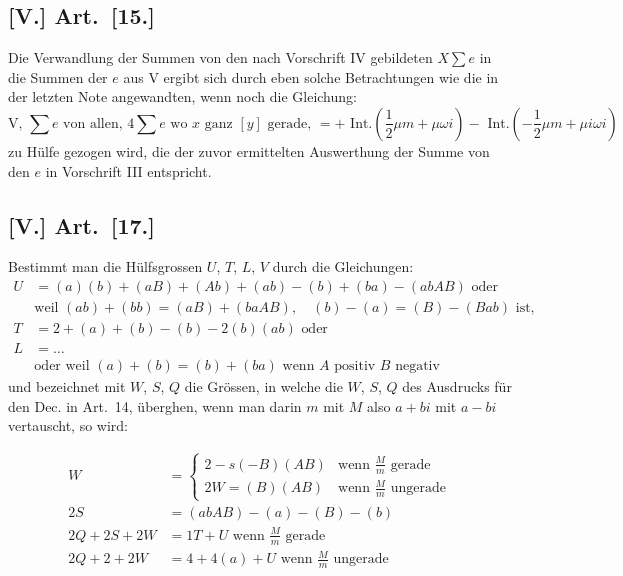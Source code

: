 \documentclass[12pt,a4paper]{article}
\begin{document}
\subsection*{[V.] Art.~[15.]}

Die Verwandlung der Summen von den nach Vorschrift IV gebildeten $X\sum e$ in die Summen der $e$ aus V ergibt sich durch eben solche Betrachtungen wie die in der letzten Note angewandten, wenn noch die Gleichung:
\[
\text{V, } \sum e \text{ von allen, } 4\sum e \text{ wo } x \text{ ganz } [y] \text{ gerade, } = + \text{ Int.}(\frac{1}{2}\mu m + \mu \omega i) - \text{ Int.}(-\frac{1}{2}\mu m + \mu i \omega i)
\]
zu Hülfe gezogen wird, die der zuvor ermittelten Auswerthung der Summe von den $e$ in Vorschrift III entspricht.

\subsection*{[V.] Art.~[17.]}

Bestimmt man die Hülfsgrossen $U$, $T$, $L$, $V$ durch die Gleichungen:
\begin{align*}
U &= (a)(b) + (aB) + (Ab) + (ab) - (b) + (ba) - (abAB) \text{ oder}\\
&\text{weil } (ab) + (bb) = (aB) + (baAB), \quad (b) - (a) = (B) - (Bab) \text{ ist,}\\
T &= 2 + (a) + (b) - (b) - 2(b)(ab) \text{ oder}\\
L &= \ldots\\
&\text{oder weil } (a) + (b) = (b) + (ba) \text{ wenn } A \text{ positiv } B \text{ negativ}
\end{align*}
und bezeichnet mit $W$, $S$, $Q$ die Grössen, in welche die $W$, $S$, $Q$ des Ausdrucks für den Dec. in Art.~14, überghen, wenn man darin $m$ mit $M$ also $a + bi$ mit $a - bi$ vertauscht, so wird:

\begin{align*}
W &= \begin{cases}
2 - s(-B)(AB) & \text{wenn } \frac{M}{m} \text{ gerade}\\
2W = (B)(AB) & \text{wenn } \frac{M}{m} \text{ ungerade}
\end{cases}\\
2S &= (abAB) - (a) - (B) - (b)\\
2Q + 2S + 2W &= 1T + U \text{ wenn } \frac{M}{m} \text{ gerade}\\
2Q + 2 + 2W &= 4 + 4(a) + U \text{ wenn } \frac{M}{m} \text{ ungerade}
\end{align*}
\end{document}
